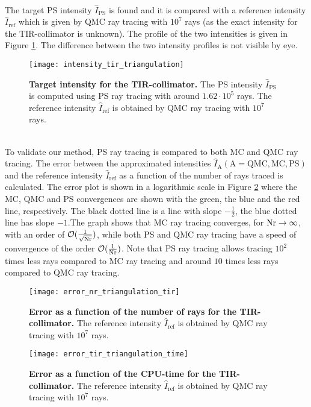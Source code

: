  \\ \indent 
The target PS intensity $\hat{I}_{\textrm{PS}}$ is found and it is compared with a reference intensity $\hat{I}_{\textrm{ref}}$ which is given by QMC ray tracing with $10^7$ rays (as the exact intensity for the TIR-collimator is unknown). The profile of the two intensities is given in Figure \ref{fig:intensity_tir_triangulation}. 
The difference between the two intensity profiles is not visible by eye.
 \begin{figure}[ht]
  \center
  \texttt{[image: intensity\_tir\_triangulation]}
  \caption{\textbf{Target intensity for the TIR-collimator.} The PS intensity $\hat{I}_{\textrm{PS}}$ is computed using PS ray tracing with around $1.62\cdot 10^5$ rays. The reference intensity $\hat{I}_{\textrm{ref}}$ is obtained by QMC ray tracing with $10^7$ rays.}
  \label{fig:intensity_tir_triangulation}
\end{figure}
\\ \indent
To validate our method, PS ray tracing is compared to both MC and QMC ray tracing. The error between the approximated intensities $\hat{I}_{\textrm{A}} (\textrm{A}=\textrm{QMC}, \textrm{MC}, \textrm{PS})$ and the reference intensity $\hat{I}_{\textrm{ref}}$ as a function of the number of rays traced is calculated. The error plot is shown in a logarithmic scale in Figure \ref{fig:error_tir_triangulation} where the MC, QMC and PS convergences are shown with the green, the blue and the red line, respectively. The black dotted line is a line with slope $-\frac{1}{2}$, the blue dotted line has slope $-1$.The graph shows that MC ray tracing converges, for $\textrm{Nr} \rightarrow \infty$, with an order of $\mathcal{O}(\frac{1}{\sqrt{\textrm{Nr}}})$, while both PS and QMC ray tracing have a speed of convergence of the order $\mathcal{O}(\frac{1}{\textrm{Nr}})$. Note that PS ray tracing allows tracing $10^2$ times less rays compared to MC ray tracing and around $10$ times less rays compared to QMC ray tracing.
 \begin{figure}[h!]
  \center
  \texttt{[image: error\_nr\_triangulation\_tir]}
  \caption{\textbf{Error as a function of the number of rays for the TIR-collimator.} The reference intensity $\hat{I}_{\textrm{ref}}$ is obtained by QMC ray tracing with $10^7$ rays.}
  \label{fig:error_tir_triangulation}
\end{figure}
\begin{figure}[h!]
  \center
  \texttt{[image: error\_tir\_triangulation\_time]}
  \caption{\textbf{Error as a function of the CPU-time for the TIR-collimator.} The reference intensity $\hat{I}_{\textrm{ref}}$ is obtained by QMC ray tracing with $10^7$ rays.}
  \label{fig:error_tir_triangulation_time}
\end{figure}
